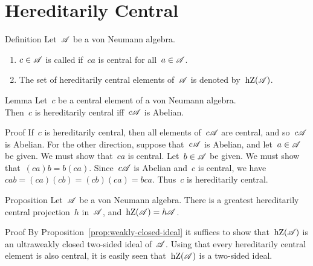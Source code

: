 \documentclass[main]{subfiles}
\begin{document}
\section{Hereditarily Central}
\begin{parsec}%
\begin{point}{Definition}%
Let~$\mathscr{A}$ be a von Neumann algebra.
\begin{enumerate}
\item
$c\in \mathscr{A}$
is called 
if~$ca$ is central for all~$a\in\mathscr{A}$.
\item
The set of hereditarily central elements of~$\mathscr{A}$
is denoted by~$\operatorname{hZ}(\mathscr{A})$.
\end{enumerate}
\end{point}
\begin{point}{Lemma}%
Let~$c$ be a central element of a von Neumann algebra.\\
Then~$c$ is hereditarily central
iff~$c\mathscr{A}$ is Abelian.
\begin{point}{Proof}%
If~$c$ is hereditarily central,
then all elements of~$c\mathscr{A}$
are central,
and so~$c\mathscr{A}$ is Abelian.
For the other direction,
suppose that~$c\mathscr{A}$ is Abelian,
and let~$a\in\mathscr{A}$ be given.
We must show that~$ca$ is central.
Let~$b\in\mathscr{A}$ be given.
We must show that~$(ca)b=b(ca)$.
Since~$c\mathscr{A}$ is Abelian
and~$c$ is central,
we have $cab=(ca)(cb)=(cb)(ca)=bca$.
Thus~$c$ is hereditarily central.
\end{point}
\end{point}
\begin{point}{Proposition}%
Let~$\mathscr{A}$ be a von Neumann algebra.
There is a greatest hereditarily central projection~$h$ in~$\mathscr{A}$,
and~$\operatorname{hZ}(\mathscr{A})=h\mathscr{A}$.
\begin{point}{Proof}%
By Proposition~\ref{prop:weakly-closed-ideal} it suffices
to show that~$\operatorname{hZ}(\mathscr{A})$ is an ultraweakly closed
two-sided ideal of~$\mathscr{A}$.
Using that every hereditarily central
element is also central, it is easily seen
 that~$\operatorname{hZ}(\mathscr{A})$ is a two-sided ideal.


\end{point}
\end{point}
\end{parsec}
\end{document}
